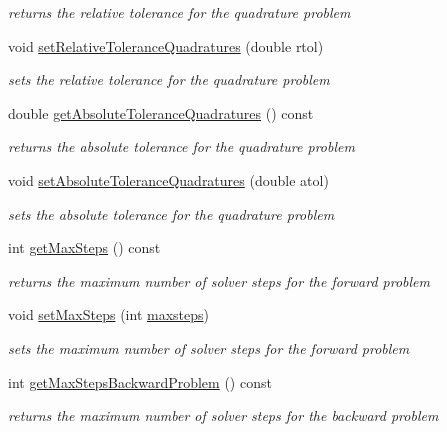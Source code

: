 \begin{DoxyCompactItemize}
\begin{DoxyCompactList}\small\item\em returns the relative tolerance for the quadrature problem \end{DoxyCompactList}\item 
void \mbox{\hyperlink{classamici_1_1_solver_a086428d30274f2b7e6f94e8e7593dd8b}{set\+Relative\+Tolerance\+Quadratures}} (double rtol)
\begin{DoxyCompactList}\small\item\em sets the relative tolerance for the quadrature problem \end{DoxyCompactList}\item 
double \mbox{\hyperlink{classamici_1_1_solver_a1f50a4e21784c2757530068483c405cb}{get\+Absolute\+Tolerance\+Quadratures}} () const
\begin{DoxyCompactList}\small\item\em returns the absolute tolerance for the quadrature problem \end{DoxyCompactList}\item 
void \mbox{\hyperlink{classamici_1_1_solver_af425163c5d98c472d17e080da4ee3b78}{set\+Absolute\+Tolerance\+Quadratures}} (double atol)
\begin{DoxyCompactList}\small\item\em sets the absolute tolerance for the quadrature problem \end{DoxyCompactList}\item 
int \mbox{\hyperlink{classamici_1_1_solver_acf39690ae4c940c7734fc3fadabb4d50}{get\+Max\+Steps}} () const
\begin{DoxyCompactList}\small\item\em returns the maximum number of solver steps for the forward problem \end{DoxyCompactList}\item 
void \mbox{\hyperlink{classamici_1_1_solver_ab321627a9f9d22013638e0eb9b14d2dc}{set\+Max\+Steps}} (int \mbox{\hyperlink{classamici_1_1_solver_a029415ebe024ac6281fd9f190aefb2ee}{maxsteps}})
\begin{DoxyCompactList}\small\item\em sets the maximum number of solver steps for the forward problem \end{DoxyCompactList}\item 
int \mbox{\hyperlink{classamici_1_1_solver_a8f683e8adf7b34cab6dff296b1d38c83}{get\+Max\+Steps\+Backward\+Problem}} () const
\begin{DoxyCompactList}\small\item\em returns the maximum number of solver steps for the backward problem \end{DoxyCompactList}\item 

\end{DoxyCompactItemize}
